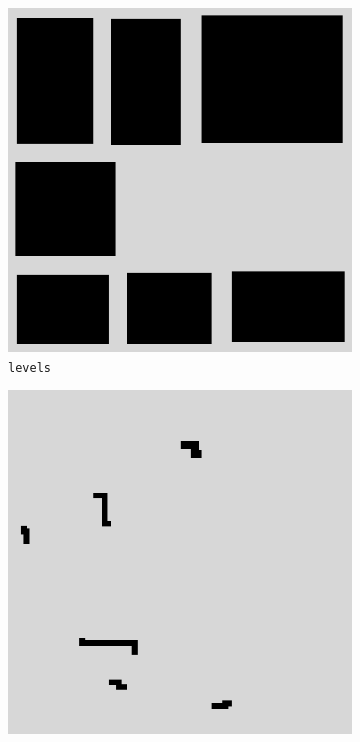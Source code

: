 \begin{figure}
    \centering
    \begin{subfigure}[b]{0.25\textwidth}
        \centering        
        \includegraphics[width = \textwidth]{resources/img/wg/wgtmod_masks_levels.png}
        \caption{\texttt{levels}}
    \end{subfigure}
    \hspace{10bp}
    \begin{subfigure}[b]{0.25\textwidth}
        \centering
        \includegraphics[width = \textwidth]{resources/img/wg/wgtmod_masks_corridors.png}

\end{subfigure}
\end{figure}
